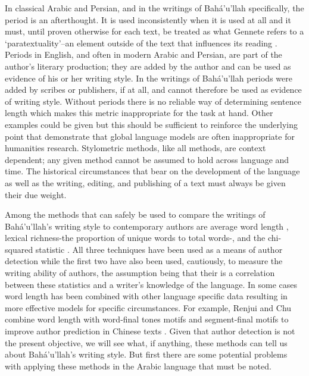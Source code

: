 \documentclass[12pt, oneside]{report}
\begin{document}
In classical Arabic and Persian, and in the writings of Bah\'{a}'u'llah specifically, the period is an afterthought.
It is used inconsistently when it is used at all and it must, until proven otherwise for each text, be treated as what Gennete refers to a `paratextuality'–an element outside of the text that influences its reading \cite{genette_gerard_palimpsests:_1997}.
Periods in English, and often in modern Arabic and Persian, are part of the author's literary production; they are added by the author and can be used as evidence of his or her writing style.
In the writings of Bah\'{a}'u'llah periods were added by scribes or publishers, if at all, and cannot therefore be used as evidence of writing style.
Without periods there is no reliable way of determining sentence length which makes this metric inappropriate for the task at hand.
Other examples could be given but this should be sufficient to reinforce the underlying point that demonstrate that global language models are often inappropriate for humanities research.
Stylometric methods, like all methods, are context dependent; any given method cannot be assumed to hold across language and time.
The historical circumstances that bear on the development of the language as well as the writing, editing, and publishing of a text must always be given their due weight.
\par
Among the methods that can safely be used to compare the writings of Bah\'{a}'u'llah's writing style to contemporary authors are average word length \cite{justin_rice_what_2018}, lexical richness-the proportion of unique words to total words-\cite{justin_rice_what_2018}, and the chi-squared statistic  \cite{kilgarriff_comparing_2001} \cite{laramee_introduction_2018}.
All three techniques have been used as a means of author detection while the first two have also been used, cautiously, to measure the writing ability of authors, the assumption being that their is a correlation between these statistics and a writer's knowledge of the language.
In some cases word length has been combined with other language specific data resulting in more effective models for specific circumstances.
For example, Renjui and Chu combine word length with word-final tones motifs and segment-final motifs to improve author prediction in Chinese texts \cite{renkui_stylometric_nodate}.
Given that author detection is not the present objective, we will see what, if anything, these methods can tell us about Bah\'{a}'u'llah's writing style. But first there are some potential problems with applying these methods in the Arabic language that must be noted.
\end{document}
